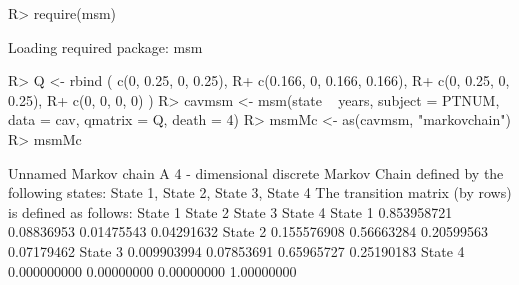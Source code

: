 \documentclass[
  nojss]{jss}
\begin{document}
\begin{CodeChunk}

\begin{CodeInput}
R> require(msm)
\end{CodeInput}

\begin{CodeOutput}
Loading required package: msm
\end{CodeOutput}

\begin{CodeInput}
R> Q <- rbind ( c(0, 0.25, 0, 0.25),
R+              c(0.166, 0, 0.166, 0.166),
R+              c(0, 0.25, 0, 0.25),
R+              c(0, 0, 0, 0) )
R> cavmsm <- msm(state ~ years, subject = PTNUM, data = cav, qmatrix = Q, death = 4)
R> msmMc <- as(cavmsm, "markovchain")
R> msmMc
\end{CodeInput}

\begin{CodeOutput}
Unnamed Markov chain 
 A  4 - dimensional discrete Markov Chain defined by the following states: 
 State 1, State 2, State 3, State 4 
 The transition matrix  (by rows)  is defined as follows: 
            State 1    State 2    State 3    State 4
State 1 0.853958721 0.08836953 0.01475543 0.04291632
State 2 0.155576908 0.56663284 0.20599563 0.07179462
State 3 0.009903994 0.07853691 0.65965727 0.25190183
State 4 0.000000000 0.00000000 0.00000000 1.00000000
\end{CodeOutput}
\end{CodeChunk}
\end{document}
